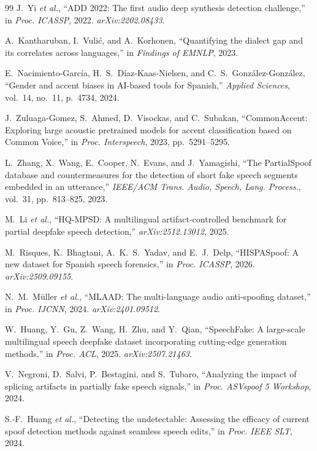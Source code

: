 \documentclass[11pt]{article}
\begin{document}
\begin{thebibliography}{99}
J.~Yi \emph{et al.},
``ADD 2022: The first audio deep synthesis detection challenge,''
in \emph{Proc. ICASSP}, 2022. \emph{arXiv:2202.08433}.

A.~Kantharuban, I.~Vuli\'c, and A.~Korhonen,
``Quantifying the dialect gap and its correlates across languages,''
in \emph{Findings of EMNLP}, 2023.

E.~Nacimiento-Garc\'ia, H.~S.~D\'iaz-Kaas-Nielsen, and
C.~S.~Gonz\'alez-Gonz\'alez,
``Gender and accent biases in AI-based tools for Spanish,''
\emph{Applied Sciences}, vol.~14, no.~11, p.~4734, 2024.

J.~Zuluaga-Gomez, S.~Ahmed, D.~Visockas, and C.~Subakan,
``CommonAccent: Exploring large acoustic pretrained models for accent
classification based on Common Voice,''
in \emph{Proc. Interspeech}, 2023, pp.~5291--5295.

L.~Zhang, X.~Wang, E.~Cooper, N.~Evans, and J.~Yamagishi,
``The PartialSpoof database and countermeasures for the detection of
short fake speech segments embedded in an utterance,''
\emph{IEEE/ACM Trans. Audio, Speech, Lang. Process.}, vol.~31,
pp.~813--825, 2023.

M.~Li \emph{et al.},
``HQ-MPSD: A multilingual artifact-controlled benchmark for partial
deepfake speech detection,'' \emph{arXiv:2512.13012}, 2025.

M.~Risques, K.~Bhagtani, A.~K.~S.~Yadav, and E.~J.~Delp,
``HISPASpoof: A new dataset for Spanish speech forensics,''
in \emph{Proc. ICASSP}, 2026. \emph{arXiv:2509.09155}.

N.~M.~M\"uller \emph{et al.},
``MLAAD: The multi-language audio anti-spoofing dataset,''
in \emph{Proc. IJCNN}, 2024. \emph{arXiv:2401.09512}.

W.~Huang, Y.~Gu, Z.~Wang, H.~Zhu, and Y.~Qian,
``SpeechFake: A large-scale multilingual speech deepfake dataset
incorporating cutting-edge generation methods,''
in \emph{Proc. ACL}, 2025. \emph{arXiv:2507.21463}.

V.~Negroni, D.~Salvi, P.~Bestagini, and S.~Tubaro,
``Analyzing the impact of splicing artifacts in partially fake speech
signals,'' in \emph{Proc. ASVspoof 5 Workshop}, 2024.

S.-F.~Huang \emph{et al.},
``Detecting the undetectable: Assessing the efficacy of current spoof
detection methods against seamless speech edits,''
in \emph{Proc. IEEE SLT}, 2024.


\end{thebibliography}
\end{document}
